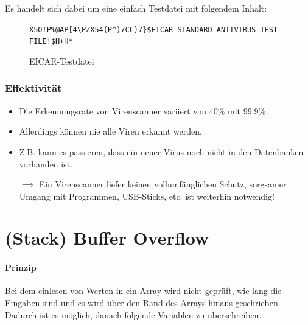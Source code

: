 \documentclass[a4paper, 11pt, accentcolor = tud3b]{tudreport}
\begin{document}
                    Es handelt sich dabei um eine einfach Testdatei mit folgendem Inhalt:
                    \begin{figure}[H]
	                    \centering
	                    \texttt{X5O!P\%@AP[4\textbackslash{}PZX54(P\^{})7CC)7\}\$EICAR-STANDARD-ANTIVIRUS-TEST-FILE!\$H+H*}
                    	\caption{EICAR-Testdatei}
                    \end{figure}

                \subsubsection{Effektivität}
                    \begin{itemize}
                    	\item Die Erkennungsrate von Virenscanner variiert von \(40\%\) mit \(99.9\%\).
                    	\item Allerdings können nie alle Viren erkannt werden.
                    	\item Z.B. kann es passieren, dass ein neuer Virus noch nicht in den Datenbanken vorhanden ist.
                    	\item[\(\implies\)] Ein Virenscanner liefer keinen vollumfänglichen Schutz, sorgsamer Umgang mit Programmen, USB-Sticks, etc. ist weiterhin notwendig!
                    \end{itemize}

        \section{(Stack) Buffer Overflow}
            \paragraph{Prinzip}
	            Bei dem einlesen von Werten in ein Array wird nicht geprüft, wie lang die Eingaben sind und es wird über den Rand des Arrays hinaus geschrieben. Dadurch ist es möglich, danach folgende Variablen zu überschreiben.
            
\end{document}
